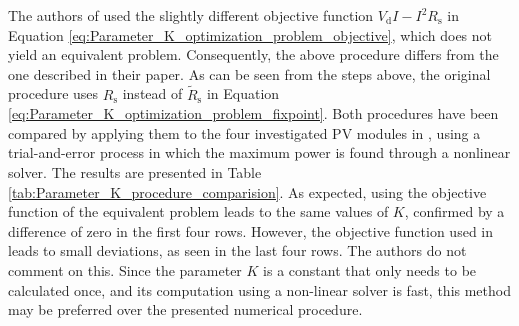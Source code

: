 \noindent
The authors of \cite{Orioli} used the slightly different objective function
\(V_{\text{d}}I - I^2R_{\text{s}}\) in Equation \ref{eq:Parameter_K_optimization_problem_objective},
which does not yield an equivalent problem. Consequently, the above procedure
differs from the one described in their paper. As can be seen from the steps
above, the original procedure uses \(R_{\text{s}}\) instead of \(\tilde{R}_{\text{s}}\) in Equation
\ref{eq:Parameter_K_optimization_problem_fixpoint}. Both
procedures have been compared by applying them to the four investigated PV modules in \cite{Orioli},
using a trial-and-error process in which the maximum power is found through
a nonlinear solver. The results are presented in Table \ref{tab:Parameter_K_procedure_comparision}.
As expected, using the objective function of the equivalent problem leads
to the same values of \(K\), confirmed by a difference of zero in the first
four rows. However, the objective function used in \cite{Orioli} leads to
small deviations, as seen in the last four rows. The authors do not
comment on this. Since the parameter \(K\) is a constant that only needs to
be calculated once, and its computation using a non-linear solver is fast,
this method may be preferred over the presented numerical procedure. 

\begin{table}
    \centering
    \caption{\small Results of comparision between the procedure of calculating the parameter \(K\) 
             as described in Orioli \cite{Orioli} and the presented procedure based on the 
             equivalent problem.}
    \label{tab:Parameter_K_procedure_comparision}
\end{table}

